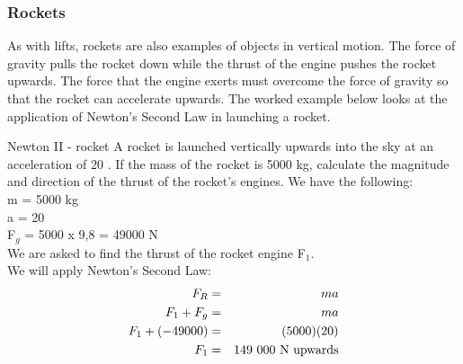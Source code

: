 \subsubsection{Rockets}
As with lifts, rockets are also examples of objects in vertical motion. The force of gravity pulls the rocket down while the thrust of the engine pushes the rocket upwards. The force that the engine exerts must overcome the force of gravity so that the rocket can accelerate upwards. The worked example below looks at the application of Newton's Second Law in launching a rocket.

\begin{wex}{Newton II - rocket}
{A rocket is launched vertically upwards into the sky at an acceleration of 20 \mss. If the mass of the rocket is 5000 kg, calculate the magnitude and direction of the thrust of the rocket's engines.
}
{
We have the following:\\
m = 5000 kg\\
a = 20 \mss\\
F$_{g}$ = 5000 x 9,8 = 49000 N\\
We are asked to find the thrust of the rocket engine F$_{1}$.\\

We will apply Newton's Second Law:
\begin{eqnarray*}
F_{R} &=& ma\\
F_{1}+ F_{g} &=& ma\\
F_{1} + (-49000) &=& (5000)(20)\\
F_{1} &=& 149~000~\rm{N~upwards}\\
\end{eqnarray*}
}
\end{wex}

